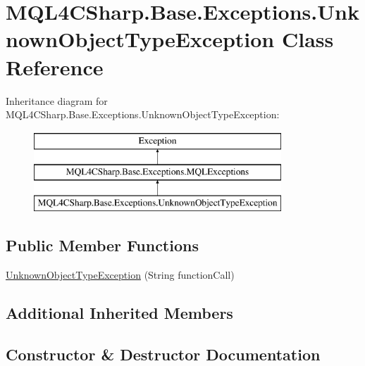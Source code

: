 \hypertarget{class_m_q_l4_c_sharp_1_1_base_1_1_exceptions_1_1_unknown_object_type_exception}{}\section{M\+Q\+L4\+C\+Sharp.\+Base.\+Exceptions.\+Unknown\+Object\+Type\+Exception Class Reference}
\label{class_m_q_l4_c_sharp_1_1_base_1_1_exceptions_1_1_unknown_object_type_exception}
Inheritance diagram for M\+Q\+L4\+C\+Sharp.\+Base.\+Exceptions.\+Unknown\+Object\+Type\+Exception\+:\begin{figure}[H]
\begin{center}
\leavevmode
\includegraphics[height=3.000000cm]{class_m_q_l4_c_sharp_1_1_base_1_1_exceptions_1_1_unknown_object_type_exception}
\end{center}
\end{figure}
\subsection*{Public Member Functions}
\begin{DoxyCompactItemize}
\item 
\hyperlink{class_m_q_l4_c_sharp_1_1_base_1_1_exceptions_1_1_unknown_object_type_exception_a7e4fe9650b813e9be5bbeabb4b04d199}{Unknown\+Object\+Type\+Exception} (String function\+Call)
\end{DoxyCompactItemize}
\subsection*{Additional Inherited Members}


\subsection{Constructor \& Destructor Documentation}
